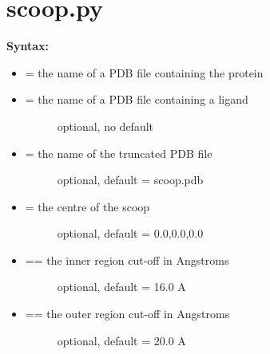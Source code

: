 \documentclass[letterpaper,10pt,english]{manual}
\begin{document}
\section{scoop.py}

\textbf{Syntax:}

\begin{itemize}
\item {} 
 = the name of a PDB file containing the protein

\item {} \begin{description}
\item[{ = the name of a PDB file containing a ligand}] \leavevmode
optional, no default

\end{description}

\item {} \begin{description}
\item[{ = the name of the truncated PDB file}] \leavevmode
optional, default = scoop.pdb

\end{description}

\item {} \begin{description}
\item[{ = the centre of the scoop}] \leavevmode
optional, default = 0.0,0.0,0.0

\end{description}

\item {} \begin{description}
\item[{ == the inner region cut-off in Angstroms}] \leavevmode
optional, default = 16.0 A

\end{description}

\item {} \begin{description}
\item[{ == the outer region cut-off in Angstroms}] \leavevmode
optional, default = 20.0 A


\end{description}
\end{itemize}
\end{document}
